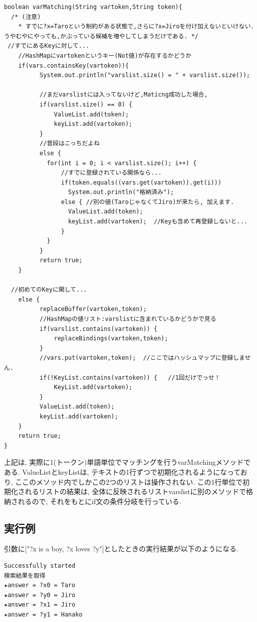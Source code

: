 \documentclass[12pt]{jarticle}
\begin{document}
\begin{lstlisting}[caption=複数候補に対応したvarMatchingメソッド,label=src:No4]
boolean varMatching(String vartoken,String token){
  /* (注意)
    * すでに?x=Taroという制約がある状態で,さらに?x=Jiroを付け加えないといけない. うやむやにやっても,かぶっている候補を増やしてしまうだけである. */
 //すでにあるKeyに対して...
    //HashMapにvartokenというキー(Not値)が存在するかどうか
    if(vars.containsKey(vartoken)){
    	  System.out.println("varslist.size() = " + varslist.size());

    	  //まだvarslistには入ってないけど,Maticng成功した場合,
    	  if(varslist.size() == 0) {
      		  ValueList.add(token);
      		  keyList.add(vartoken);
    	  }
    	  //普段はこっちだよね
    	  else {
    	  	for(int i = 0; i < varslist.size(); i++) {
    		    //すでに登録されている関係なら...
    		    if(token.equals((vars.get(vartoken)).get(i)))
    			  System.out.println("格納済み");
          	    else { //別の値(TaroじゃなくてJiro)が来たら, 加えます.
          		  ValueList.add(token);
          		  keyList.add(vartoken);  //Keyも含めて再登録しないと...
         	    }
    	  	}
    	  }
    	  return true;
    }

  //初めてのKeyに関して...
    else {
          replaceBuffer(vartoken,token);
          //HashMapの値リスト:varslistに含まれているかどうかで見る
          if(varslist.contains(vartoken)) {
              replaceBindings(vartoken,token);
          }
          //vars.put(vartoken,token);  //ここではハッシュマップに登録しません.
          if(!KeyList.contains(vartoken)) {   //1回だけでっせ！
        	  KeyList.add(vartoken);
          }
          ValueList.add(token);
          keyList.add(vartoken);
    }
    return true;
}
\end{lstlisting}

上記は, 実際に1(トークン)単語単位でマッチングを行うvarMatchingメソッドである. ValueListとkeyListは, テキストの1行ずつで初期化されるようになっており, ここのメソッド内でしかこの2つのリストは操作されない. この1行単位で初期化されるリストの結果は, 全体に反映されるリストvarslistに別のメソッドで格納されるので, それをもとにif文の条件分岐を行っている.

\subsection{実行例}
引数に["?x is a boy, ?x loves ?y"]としたときの実行結果が以下のようになる.
\begin{lstlisting}
Successfully started
検索結果を取得
★answer = ?x0 = Taro
★answer = ?y0 = Jiro
★answer = ?x1 = Jiro
★answer = ?y1 = Hanako
\end{lstlisting}
\end{document}
